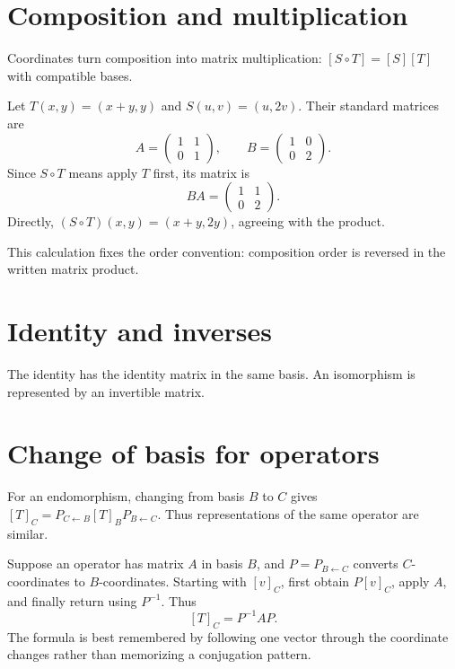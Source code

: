 \section{Composition and multiplication}
Coordinates turn composition into matrix multiplication: $[S\circ T]=[S][T]$ with compatible bases.


\begin{example}\label{ex:i07-expand-02}
Let \(T(x,y)=(x+y,y)\) and \(S(u,v)=(u,2v)\). Their standard matrices are
\[
A=\begin{pmatrix}1&1\\0&1\end{pmatrix},\qquad
B=\begin{pmatrix}1&0\\0&2\end{pmatrix}.
\]
Since \(S\circ T\) means apply \(T\) first, its matrix is
\[
BA=\begin{pmatrix}1&1\\0&2\end{pmatrix}.
\]
Directly,
\((S\circ T)(x,y)=(x+y,2y)\), agreeing with the product.

This calculation fixes the order convention: composition order is reversed in
the written matrix product.
\end{example}
\section{Identity and inverses}
The identity has the identity matrix in the same basis. An isomorphism is represented by an invertible matrix.

\section{Change of basis for operators}
For an endomorphism, changing from basis $B$ to $C$ gives $[T]_C=P_{C\leftarrow B}[T]_B P_{B\leftarrow C}$. Thus representations of the same operator are similar.


\begin{example}\label{ex:i07-expand-03}
Suppose an operator has matrix \(A\) in basis \(B\), and
\(P=P_{B\leftarrow C}\) converts \(C\)-coordinates to \(B\)-coordinates.
Starting with \([v]_C\), first obtain \(P[v]_C\), apply \(A\), and finally
return using \(P^{-1}\). Thus
\[
[T]_C=P^{-1}AP.
\]
The formula is best remembered by following one vector through the coordinate
changes rather than memorizing a conjugation pattern.
\end{example}
